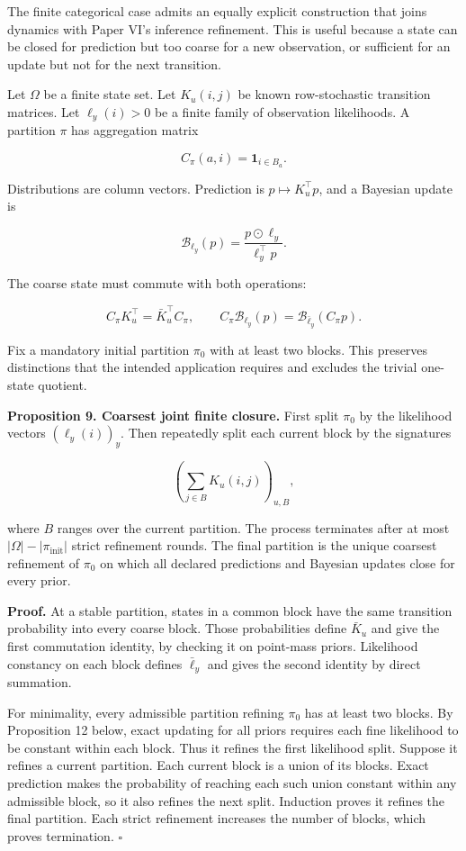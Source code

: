 \documentclass[11pt,letterpaper]{article}
\begin{document}
The finite categorical case admits an equally explicit construction that
joins dynamics with Paper VI's inference refinement. This is useful
because a state can be closed for prediction but too coarse for a new
observation, or sufficient for an update but not for the next
transition.

Let \(\Omega\) be a finite state set. Let \(K_u(i,j)\) be known
row-stochastic transition matrices. Let \(\ell_y(i)>0\) be a finite
family of observation likelihoods. A partition \(\pi\) has aggregation
matrix

\[
C_\pi(a,i)=\mathbf 1_{i\in B_a}.
\]

Distributions are column vectors. Prediction is \(p\mapsto K_u^\top p\),
and a Bayesian update is

\[
\mathcal B_{\ell_y}(p)
=\frac{p\odot\ell_y}{\ell_y^\top p}.
\]

The coarse state must commute with both operations:

\[
C_\pi K_u^\top=\bar K_u^\top C_\pi,
\qquad
C_\pi\mathcal B_{\ell_y}(p)
=\mathcal B_{\bar\ell_y}(C_\pi p).
\]

Fix a mandatory initial partition \(\pi_0\) with at least two blocks.
This preserves distinctions that the intended application requires and
excludes the trivial one-state quotient.

\textbf{Proposition 9. Coarsest joint finite closure.} First split
\(\pi_0\) by the likelihood vectors \((\ell_y(i))_y\). Then repeatedly
split each current block by the signatures

\[
\left(\sum_{j\in B}K_u(i,j)\right)_{u,B},
\]

where \(B\) ranges over the current partition. The process terminates
after at most \(|\Omega|-|\pi_{\mathrm{init}}|\) strict refinement
rounds. The final partition is the unique coarsest refinement of
\(\pi_0\) on which all declared predictions and Bayesian updates close
for every prior.

\textbf{Proof.} At a stable partition, states in a common block have the
same transition probability into every coarse block. Those probabilities
define \(\bar K_u\) and give the first commutation identity, by checking
it on point-mass priors. Likelihood constancy on each block defines
\(\bar\ell_y\) and gives the second identity by direct summation.

For minimality, every admissible partition refining \(\pi_0\) has at
least two blocks. By Proposition 12 below, exact updating for all priors
requires each fine likelihood to be constant within each block. Thus it
refines the first likelihood split. Suppose it refines a current
partition. Each current block is a union of its blocks. Exact prediction
makes the probability of reaching each such union constant within any
admissible block, so it also refines the next split. Induction proves it
refines the final partition. Each strict refinement increases the number
of blocks, which proves termination. \(\square\)
\end{document}
